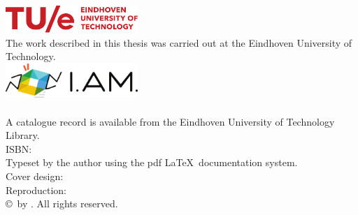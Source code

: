 \thispagestyle{empty}
\vspace*{30mm}\noindent
\begin{center}
{\LARGE\sf\maintitle}\\[4.5cm] %
{\Large\sf \@author}
\end{center}

\newpage
\thispagestyle{empty}






\vspace*{\fill}
\noindent\includegraphics[width=5cm]{img/TUE-logo.pdf}\\
{\small The work described in this thesis was carried out at the Eindhoven University of
Technology.}\\[8mm]

\noindent\includegraphics[width=5cm]{img/ProjectLogo.pdf}\\[2mm]
\noindent\bgroup\small\project
\\[8mm]

\noindent\bgroup\small
A catalogue record is available from the Eindhoven University of Technology Library.\\
ISBN: \isbn\\[4mm]

Typeset by the author using the pdf \LaTeX \ documentation system.\\
Cover design: \designer \\
Reproduction: \printer\\[8mm]
\copyright\year \ by \@author. All rights reserved.}
\egroup

\newpage
\thispagestyle{empty}





